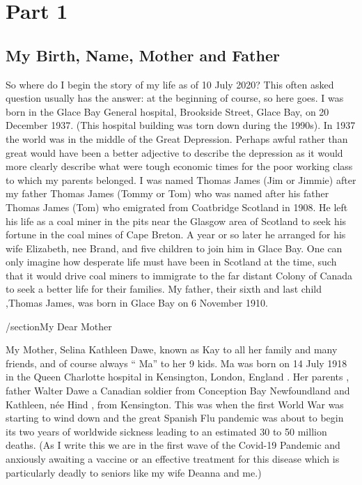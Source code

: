 \chapter{Part 1}

\section{My Birth, Name, Mother and Father}

So where do I begin the story of my life as of 10 July 2020? This often asked question usually has the answer: at the beginning of course, so here goes. I was born in the Glace Bay General hospital, Brookside Street, Glace Bay, on 20 December 1937. (This hospital building was torn down during the 1990s). In 1937 the world was in the middle of the Great Depression. Perhaps awful rather than great would have been a better adjective to describe the depression as it would more clearly describe what were tough economic times for the poor working class to which my parents belonged. I was named Thomas James (Jim or Jimmie) after my father Thomas James (Tommy or Tom) who was named after his father Thomas James (Tom) who emigrated from Coatbridge Scotland in 1908. He left his life as a coal miner in the pits near the Glasgow area of Scotland to seek his fortune in the coal mines of Cape Breton. A year or so later he arranged for his wife Elizabeth, nee Brand, and five children to join him in Glace Bay. One can only imagine how desperate life must have been in Scotland at the time, such that it would drive coal miners to immigrate to the far distant Colony of Canada to seek a better life for their families. My father, their sixth and last child ,Thomas James, was born in Glace Bay on 6 November 1910.

/section{My Dear Mother}

My Mother, Selina Kathleen Dawe, known as Kay to all her family and many friends, and of course always “ Ma” to her 9 kids. Ma was born on 14 July 1918 in the Queen Charlotte hospital in Kensington, London, England . Her parents , father Walter Dawe a Canadian soldier from Conception Bay Newfoundland and Kathleen, née Hind , from Kensington. This was when the first World War was starting to wind down and the great Spanish Flu pandemic was about to begin its two years of worldwide sickness leading to an estimated 30 to 50 million deaths. (As I write this we are in the first wave of the Covid-19 Pandemic and anxiously awaiting a vaccine or an effective treatment for this disease which is particularly deadly to seniors like my wife Deanna and me.)

